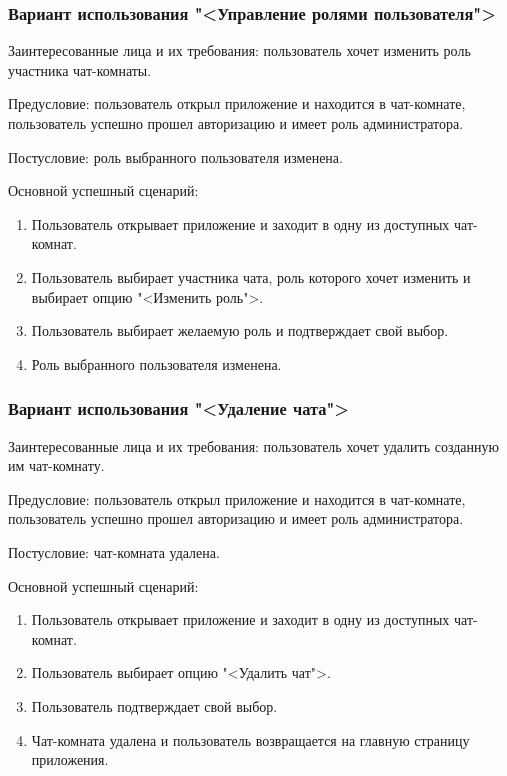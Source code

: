 \subsubsection{Вариант использования "<Управление ролями пользователя">}

Заинтересованные лица и их требования: пользователь хочет изменить роль участника чат-комнаты.

Предусловие: пользователь открыл приложение и находится в чат-комнате, пользователь успешно прошел авторизацию и имеет роль администратора.

Постусловие: роль выбранного пользователя изменена.

Основной успешный сценарий:

\begin{enumerate}
	\item Пользователь открывает приложение и заходит в одну из доступных чат-комнат.
	\item Пользователь выбирает участника чата, роль которого хочет изменить и выбирает опцию "<Изменить роль">.
	\item Пользователь выбирает желаемую роль и подтверждает свой выбор.
	\item Роль выбранного пользователя изменена.
\end{enumerate}

\subsubsection{Вариант использования "<Удаление чата">}

Заинтересованные лица и их требования: пользователь хочет удалить созданную им чат-комнату.

Предусловие: пользователь открыл приложение и находится в чат-комнате, пользователь успешно прошел авторизацию и имеет роль администратора.

Постусловие: чат-комната удалена.

Основной успешный сценарий:

\begin{enumerate}
	\item Пользователь открывает приложение и заходит в одну из доступных чат-комнат.
	\item Пользователь выбирает опцию "<Удалить чат">.
	\item Пользователь подтверждает свой выбор.
	\item Чат-комната удалена и пользователь возвращается на главную страницу приложения.
\end{enumerate}

